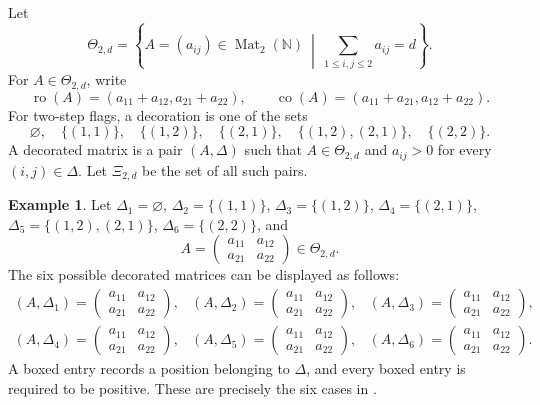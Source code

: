 \documentclass[12pt]{amsart}
\numberwithin{equation}{section}
\theoremstyle{definition}
\theoremstyle{definition}
\newtheorem{example}[theorem]{Example}
\newcommand{\ro}{\operatorname{ro}}
\newcommand{\co}{\operatorname{co}}
\begin{document}
Let
$$
\Theta_{2,d}=
\left\{
A=(a_{ij})\in\operatorname{Mat}_2(\mathbb N)
\ \middle|\
\sum_{1\le i,j\le2}a_{ij}=d
\right\}.
$$
For $A\in\Theta_{2,d}$, write
$$
\ro(A)=(a_{11}+a_{12},a_{21}+a_{22}),
\qquad
\co(A)=(a_{11}+a_{21},a_{12}+a_{22}).
$$
For two-step flags, a decoration is one of the sets
$$
\varnothing,\quad
\{(1,1)\},\quad
\{(1,2)\},\quad
\{(2,1)\},\quad
\{(1,2),(2,1)\},\quad
\{(2,2)\}.
$$
A decorated matrix is a pair $(A,\Delta)$ such that $A\in\Theta_{2,d}$ and $a_{ij}>0$ for every $(i,j)\in\Delta$. Let $\Xi_{2,d}$ be the set of all such pairs.

\begin{example}\label{ex:sixdecor}
Let $\Delta_1=\varnothing$, $
\Delta_2=\{(1,1)\}$, $
\Delta_3=\{(1,2)\}$, $
\Delta_4=\{(2,1)\}$, $
\Delta_5=\{(1,2),(2,1)\}$, $
\Delta_6=\{(2,2)\}$, and
$$
A=\begin{pmatrix}a_{11}&a_{12}\\a_{21}&a_{22}\end{pmatrix}\in\Theta_{2,d}.
$$
The six possible decorated matrices can be displayed as follows:
$$
\begin{array}{ccc}
   (A,\Delta_1)=\begin{pmatrix}a_{11}&a_{12}\\a_{21}&a_{22}\end{pmatrix},  &(A,\Delta_2)=\begin{pmatrix}\boxed{a_{11}}&a_{12}\\a_{21}&a_{22}\end{pmatrix},  &(A,\Delta_3)=\begin{pmatrix}a_{11}&\boxed{a_{12}}\\a_{21}&a_{22}\end{pmatrix},\\
    (A,\Delta_4)=\begin{pmatrix}a_{11}&a_{12}\\\boxed{a_{21}}&a_{22}\end{pmatrix}, &(A,\Delta_5)=\begin{pmatrix}a_{11}&\boxed{a_{12}}\\\boxed{a_{21}}&a_{22}\end{pmatrix},  &(A,\Delta_6)=\begin{pmatrix}a_{11}&a_{12}\\a_{21}&\boxed{a_{22}}\end{pmatrix}.
\end{array}
$$
A boxed entry records a position belonging to $\Delta$, and every boxed entry is required to be positive. These are precisely the six cases in \cite[(3.1)]{Ros18}.
\end{example}
\end{document}
